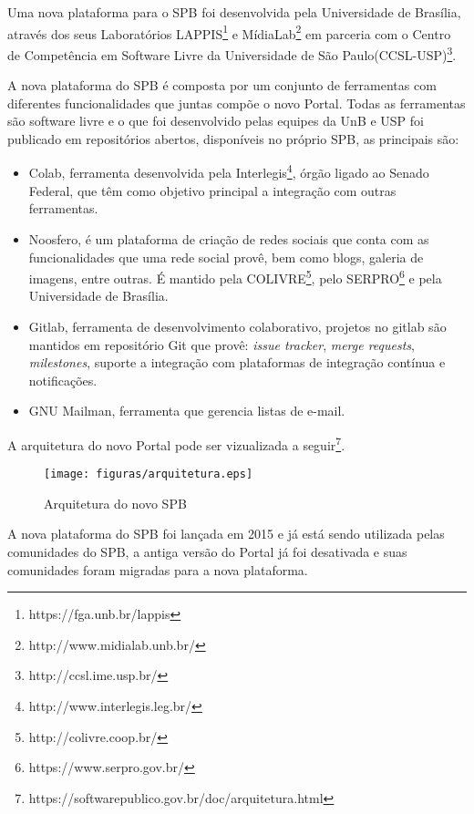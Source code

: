 Uma nova plataforma para o SPB foi desenvolvida
pela Universidade de Brasília, através dos seus Laboratórios LAPPIS\footnote{https://fga.unb.br/lappis} 
e MídiaLab\footnote{http://www.midialab.unb.br/} 
em parceria com o Centro de Competência em Software Livre da Universidade de São Paulo(CCSL-USP)\footnote{http://ccsl.ime.usp.br/}.

A nova plataforma do SPB é composta por um conjunto de ferramentas com diferentes funcionalidades
que juntas compõe o novo Portal. Todas as ferramentas são software livre e o que foi desenvolvido pelas equipes da UnB e 
USP foi publicado em repositórios abertos, disponíveis no próprio SPB, as principais são:
\begin{itemize}

\item Colab, ferramenta desenvolvida pela Interlegis\footnote{http://www.interlegis.leg.br/}, órgão ligado 
ao Senado Federal, que têm como objetivo principal a integração com outras ferramentas.

\item Noosfero, é um plataforma de criação de redes sociais que conta com as funcionalidades
que uma rede social provê, bem como blogs, galeria de imagens, entre outras. É mantido pela 
COLIVRE\footnote{http://colivre.coop.br/}, pelo SERPRO\footnote{https://www.serpro.gov.br/} e pela
Universidade de Brasília.

\item Gitlab, ferramenta de desenvolvimento colaborativo, projetos no gitlab são mantidos em 
repositório Git que provê: \textit{issue tracker}, \textit{merge requests}, 
\textit{milestones}, suporte a integração com plataformas de integração contínua e notificações.

\item GNU Mailman, ferramenta que gerencia listas de e-mail.

\end{itemize}

A arquitetura do novo Portal pode ser vizualizada a seguir\footnote{https://softwarepublico.gov.br/doc/arquitetura.html}.

\begin{figure}[h]
	\centering
	\label{arquitetura}
		\texttt{[image: figuras/arquitetura.eps]}
	\caption{Arquitetura do novo SPB}
\end{figure}


A nova plataforma do SPB foi lançada em 2015 e já está sendo utilizada pelas comunidades
do SPB, a antiga versão do Portal já foi desativada e suas comunidades foram 
migradas para a nova plataforma. 

